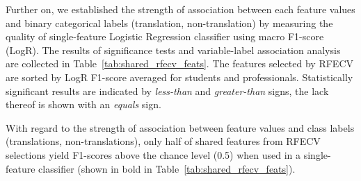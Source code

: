 Further on, we established the strength of association between each feature values and binary categorical labels (translation, non-translation) by measuring the quality of single-feature Logistic Regression classifier using macro F1-score (LogR). The results of significance tests and variable-label association analysis are collected in Table~\ref{tab:shared_rfecv_feats}. The features selected by RFECV are sorted by LogR F1-score averaged for students and professionals. Statistically significant results are indicated by \textit{less-than} and \textit{greater-than} signs, the lack thereof is shown with an \textit{equals} sign.

With regard to the strength of association between feature values and class labels (translations, non-translations), only half of shared features from RFECV selections yield F1-scores above the chance level (0.5) when used in a single-feature classifier (shown in bold in Table~\ref{tab:shared_rfecv_feats}).
